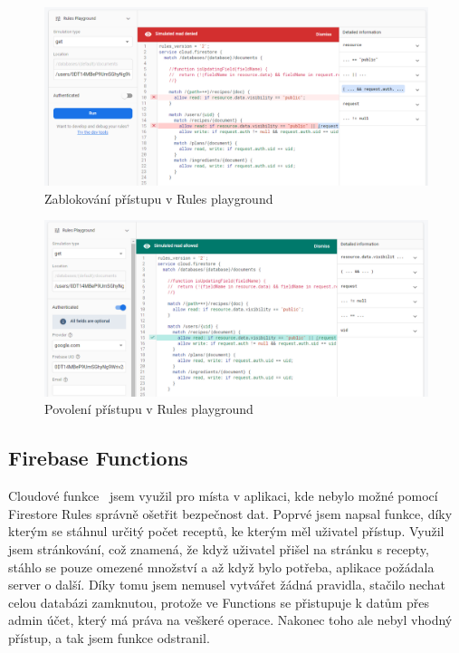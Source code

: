 \begin{figure}[H]
    \includegraphics[width=\textwidth]{images/recipeo-rules-denied}
    \caption{Zablokování přístupu v Rules playground} \label{picture:recipeo:rules-denied}
\end{figure}

\begin{figure}[H]
    \includegraphics[width=\textwidth]{images/recipeo-rules-allowed}
    \caption{Povolení přístupu v Rules playground} \label{picture:recipeo:rules-allowed}
\end{figure}

\subsection{Firebase Functions}
Cloudové funkce~\cite{FirebaseFunctions} jsem využil pro místa v aplikaci, kde nebylo možné pomocí Firestore Rules správně ošetřit bezpečnost dat.
Poprvé jsem napsal funkce, díky kterým se stáhnul určitý počet receptů, ke kterým měl uživatel přístup. Využil jsem stránkování,
což znamená, že když uživatel přišel na stránku s recepty, stáhlo se pouze omezené množství a až když bylo potřeba, aplikace požádala
server o další. Díky tomu jsem nemusel vytvářet žádná pravidla, stačilo nechat celou databázi zamknutou, protože ve Functions se přistupuje
k datům přes admin účet, který má práva na veškeré operace. Nakonec toho ale nebyl vhodný přístup, a tak jsem funkce odstranil.


